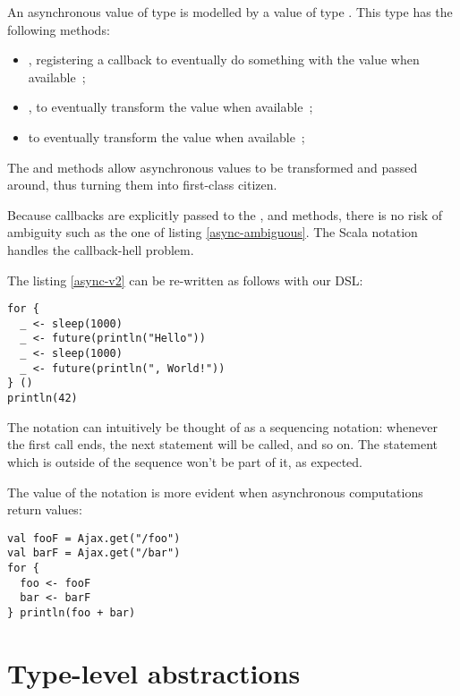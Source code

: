 \documentclass[american,english,runningheads]{llncs}
\begin{document}
An asynchronous value of type  is modelled by a value of type . This type has the following methods:
\begin{itemize}
\item {}, registering a callback to eventually do something with the value when available~;
\item {}, to eventually transform the value when available~;
\item {} to eventually transform the value when available~;
\end{itemize}

The  and  methods allow asynchronous values to be transformed and passed around, thus turning them into first-class citizen.

Because callbacks are explicitly passed to the ,  and  methods, there is no risk of ambiguity such as the one of listing \ref{async-ambiguous}. The Scala  notation handles the callback-hell problem.

The listing \ref{async-v2} can be re-written as follows with our DSL:

\begin{lstlisting}
for {
  _ <- sleep(1000)
  _ <- future(println("Hello"))
  _ <- sleep(1000)
  _ <- future(println(", World!"))
} ()
println(42)
\end{lstlisting}

The  notation can intuitively be thought of as a sequencing notation: whenever the first  call ends, the next statement will be called, and so on. The  statement which is outside of the sequence won’t be part of it, as expected.

The value of the  notation is more evident when asynchronous computations return values:

\begin{lstlisting}
val fooF = Ajax.get("/foo")
val barF = Ajax.get("/bar")
for {
  foo <- fooF
  bar <- barF
} println(foo + bar)
\end{lstlisting}


\section{Type-level abstractions}
\label{type-level}
\end{document}
